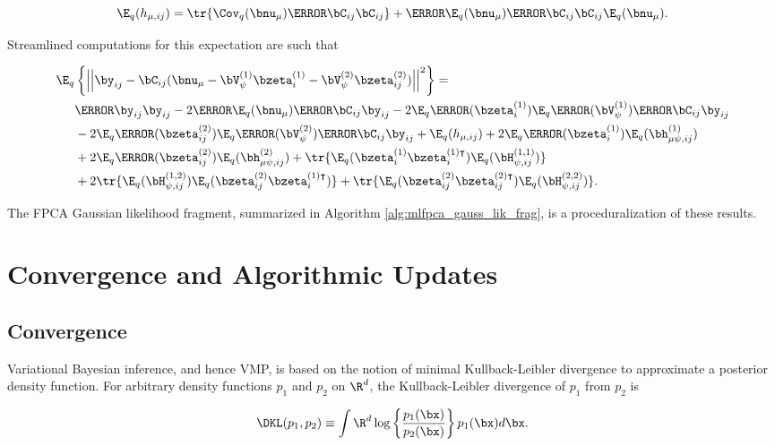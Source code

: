 \documentclass[12pt]{article}
\theoremstyle{plain}
\theoremstyle{definition}
\theoremstyle{remark}
\def\numu{\bnu_\mu}
\newcommand\hmu[1]{h_{\mu, #1}}
\newcommand\hmupsiL[2]{\bh^{(#1)}_{\mu \psi, #2}}
\newcommand\HpsiL[2]{\bH^{(#1)}_{\psi, #2}}
\newcommand\VpsiL[1]{\bV^{(#1)}_{\psi}}
\newcommand\bzetaL[2]{\bzeta^{(#1)}_{#2}}
\newcommand\bzetaTL[2]{\bzeta^{(#1) \intercal}_{#2}}
\begin{document}
\[
	\E_q (\hmu{ij}) =
		\tr \{ \Cov_q (\numu) \T{\bC_{ij}} \bC_{ij} \}
		+ \T{\E_q (\numu)} \T{\bC_{ij}} \bC_{ij} \E_q (\numu).
\]

\noindent Streamlined computations for this expectation are such that

\begin{align*}
	\E_q &\left\{
		\left|\left| \by_{ij} - \bC_{ij} ( \numu - \VpsiL{1} \bzetaL{1}{i} - \VpsiL{2} \bzetaL{2}{ij} ) \right|\right|^2
	\right\} = \\
		& \T{\by_{ij}} \by_{ij}
			- 2 \T{\E_q (\numu)} \T{\bC_{ij}} \by_{ij}
			-2 \E_q \T{(\bzetaL{1}{i})} \E_q \T{(\VpsiL{1})} \T{\bC_{ij}} \by_{ij} \\
		&-2 \E_q \T{(\bzetaL{2}{ij})} \E_q \T{(\VpsiL{2})} \T{\bC_{ij}} \by_{ij}
			+ \E_q (\hmu{ij})
			+ 2 \E_q \T{(\bzetaL{1}{i})} \E_q (\hmupsiL{1}{ij}) \\
		& + 2 \E_q \T{(\bzetaL{2}{ij})} \E_q (\hmupsiL{2}{ij})
			+ \tr \{ \E_q (\bzetaL{1}{i} \bzetaTL{1}{i}) \E_q (\HpsiL{1, 1}{ij}) \} \\
		& + 2 \tr \{ \E_q (\HpsiL{1, 2}{ij}) \E_q (\bzetaL{2}{ij} \bzetaTL{1}{i}) \}
			+ \tr \{ \E_q (\bzetaL{2}{ij} \bzetaTL{2}{ij}) \E_q (\HpsiL{2, 2}{ij}) \}.
\end{align*}

The FPCA Gaussian likelihood fragment, summarized in Algorithm \ref{alg:mlfpca_gauss_lik_frag}, is a
proceduralization of these results.


\section{Convergence and Algorithmic Updates}
\label{app:conv_updates}


\subsection{Convergence}
\label{app:convergence}

Variational Bayesian inference, and hence VMP,
is based on the notion of minimal Kullback-Leibler divergence to approximate a
posterior density function. For arbitrary density functions $p_1$
and $p_2$ on $\R^d$, the Kullback-Leibler divergence of $p_1$ from $p_2$ is

\[
	\DKL (p_1, p_2) \equiv \int {\R^d} \log \left\{ \frac{p_1 (\bx)}{p_2 (\bx)} \right\} p_1 (\bx) d\bx.
\]
\end{document}
